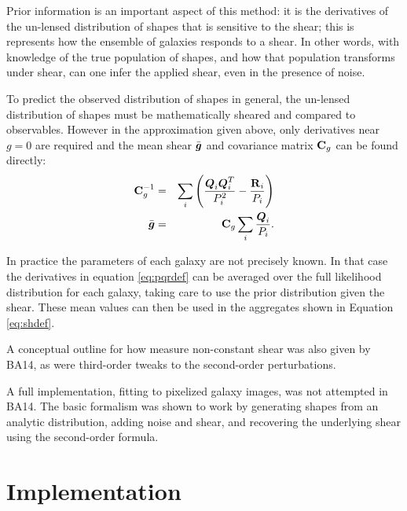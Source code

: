 \documentclass[12pt,preprint]{aastex}
\newcommand{\vecg}{\mbox{\boldmath $g$}}
\newcommand{\vecD}{\mbox{\boldmath $D$}}
\newcommand{\vecQ}{\mbox{\boldmath $Q$}}
\newcommand{\matR}{\mbox{$\bf R$}}
\newcommand{\matC}{\mbox{$\bf C$}}
\newcommand{\bnabg}{ \boldsymbol{\nabla_g}}
\begin{document}
Prior information is an important aspect of this method: it is the derivatives
of the un-lensed distribution of shapes that is sensitive to the shear; this is
represents how the ensemble of galaxies responds to a shear.  In other words,
with knowledge of the true population of shapes, and how that population
transforms under shear, can one infer the applied shear, even in the presence
of noise.

To predict the observed distribution of shapes in general, the un-lensed
distribution of shapes must be mathematically sheared and compared to
observables.  However in the approximation given above, only derivatives near
$g=0$ are required and the mean shear $\bar{\vecg}$ and covariance matrix
$\matC_g$ can be found directly:
\begin{eqnarray}
\matC_g^{-1} & = & \sum_i \left(\frac{\vecQ_i \vecQ^T_i}{P_i^2} - \frac{\matR_i}{P_i}\right) \label{eq:cdef} \\
\bar{\vecg} & = &  \matC_g \sum_i \frac{\vecQ_i}{P_i}. \label{eq:shdef}
\end{eqnarray}

In practice the parameters of each galaxy are not precisely known. In that case
the derivatives in equation \ref{eq:pqrdef} can be averaged over the full
likelihood distribution for each galaxy, taking care to use the prior
distribution given the shear.  These mean values can then be used in the
aggregates shown in Equation \ref{eq:shdef}.

A conceptual outline for how measure non-constant shear was also given by BA14,
as were third-order tweaks to the second-order perturbations.

A full implementation, fitting to pixelized galaxy images, was not attempted in
BA14.  The basic formalism was shown to work by generating shapes from
an analytic distribution, adding noise and shear, and recovering the underlying
shear using the second-order formula.

\section{Implementation} \label{sec:impl}
\end{document}
